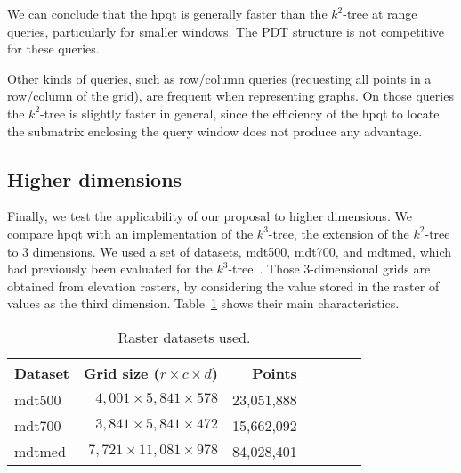 \documentclass{elsarticle}
\newcommand{\kt}{$k^2$-tree\xspace}
\newcommand{\ktree}{\kt}
\newcommand{\koct}{$k^3$-tree\xspace}
\newcommand{\mdta}{\textsf{mdt500}\xspace}
\newcommand{\mdtb}{\textsf{mdt700}\xspace}
\newcommand{\mdtc}{\textsf{mdtmed}\xspace}
\newcommand{\hpqt}{\textsf{hpqt}\xspace}
\newcommand{\pdt}{PDT\xspace}
\newcommand{\no}[1]{}
\begin{document}
We can conclude that the \hpqt is generally faster than the \kt at range queries, particularly for smaller windows. The \pdt structure is not competitive for these queries.



\no{
\begin{figure}[t!]
 \centering
     \texttt{[image: figures/rows/rows-dblp]}
    \texttt{[image: figures/rows/rows-indochina]}
    \texttt{[image: figures/rows/rows-enwiki]}
    \texttt{[image: figures/rows/rows-uk]}
    \texttt{[image: figures/rows/rows-geo-sparse]}
    \texttt{[image: figures/rows/rows-rdf-sparse]}
    \texttt{[image: figures/rows/rows-geo-med]}
    \texttt{[image: figures/rows/rows-rdf-med]}
    \texttt{[image: figures/rows/rows-geo-dense]}
    \texttt{[image: figures/rows/rows-rdf-dense]}
  \caption{Query times for row queries.}
  \label{fig:rows}
\end{figure}
}

Other kinds of queries, such as row/column queries (requesting all points in a row/column of the grid), are frequent when representing graphs. On those queries the \ktree is slightly faster in general, since the efficiency of the \hpqt to locate the submatrix enclosing the query window does not produce any advantage. 


\subsection{Higher dimensions}

Finally, we test the applicability of our proposal to higher dimensions. We compare \hpqt with an implementation of the \koct, the extension of the \kt to 3 dimensions. We used a set of datasets, \mdta, \mdtb, and \mdtc, which had previously been evaluated for the \koct~\cite{BCBNP20}. Those 3-dimensional grids are obtained from elevation rasters, by considering the value stored in the raster of values as the third dimension. Table~\ref{tab:spaceraster} shows their main characteristics. 

\begin{table}[t]
\centering
\begin{tabular}{ l | r r r | r r r}
Dataset & Grid size ($r \times c \times d$) & Points \\
\hline
\mdta   & $4,001 \times 5,841 \times 578 $   &  23,051,888  \\
\mdtb   & $3,841 \times 5,841 \times 472 $   &  15,662,092 \\
\mdtc   & $7,721 \times 11,081 \times 978$   &  84,028,401  \\
\hline
\end{tabular}
\caption{Raster datasets used.}
\label{tab:spaceraster}
\end{table}
\end{document}
